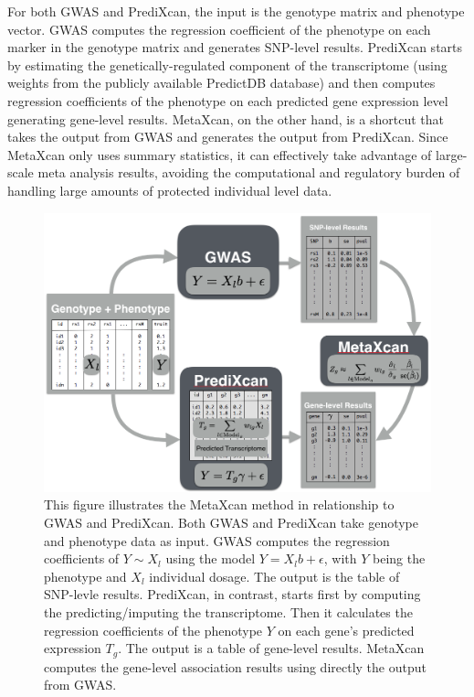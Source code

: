 \documentclass[10pt]{article}
\begin{document}
For both GWAS and PrediXcan, the input is the genotype matrix and phenotype vector. GWAS computes the regression coefficient of the phenotype on each marker in the genotype matrix and generates SNP-level results. PrediXcan starts by estimating the genetically-regulated component of the transcriptome (using weights from the publicly available PredictDB database) and then computes regression coefficients of the phenotype on each predicted gene expression level generating gene-level results. MetaXcan, on the other hand,  is a shortcut that takes the output from GWAS and generates the output from PrediXcan. Since MetaXcan only uses summary statistics, it can effectively take advantage of large-scale meta analysis results, avoiding the computational and regulatory burden of handling large amounts of protected individual level data.
%
%
%
%

\begin{figure}
\includegraphics[width=\textwidth]{plots/Fig1-MetaXcan-PrediXcan-GWAS.png}
\caption{This figure illustrates the MetaXcan method in relationship to GWAS and PrediXcan. Both GWAS and PrediXcan take genotype and phenotype data as input. GWAS computes the regression coefficients of $Y\sim X_l$ using the model $Y=X_l b + \epsilon$, with $Y$ being the phenotype and $X_l$ individual dosage. The output is the table of SNP-levle results. PrediXcan, in contrast, starts first by computing the predicting/imputing the transcriptome. Then it calculates the regression coefficients of the phenotype $Y$ on each gene's predicted expression $T_g$. The output is a table of gene-level results. MetaXcan computes the gene-level association results using directly the output from GWAS.} %
\label{fig:MetaXcan-PrediXcan-GWAS}
\end{figure}
\end{document}
